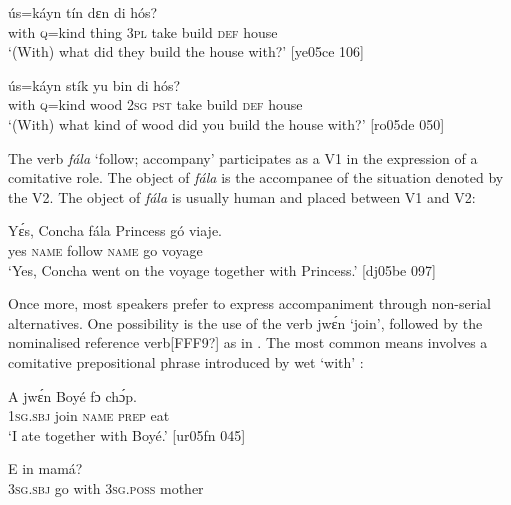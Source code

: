 \ea%
    \label{ex:key:1571}
    \gll {}    ús=káyn  tín    dɛn       di  hós?\\
with    \textsc{q}=kind  thing  \textsc{3pl}  take  build  \textsc{def}  house\\

\glt ‘(With) what did they build the house with?’ [ye05ce 106]
\z


\ea%
    \label{ex:key:1572}
    \gll {}    ús=káyn  stík    yu  bin         di  hós?\\
with    \textsc{q}=kind  wood  \textsc{2sg}  \textsc{pst}  take    build  \textsc{def}  house\\

\glt ‘(With) what kind of wood did you build the house with?’ [ro05de 050]
\z

The verb \textit{fála} ‘follow; accompany’ participates as a V1 in the expression of a comitative role. The object of \textit{fála} is the accompanee of the situation denoted by the V2. The object of \textit{fála} is usually human and placed between V1 and V2:


\ea%
    \label{ex:key:1573}
    \gll Yɛ́s,    Concha  fála    Princess    gó  viaje.\\
yes    \textsc{name}  follow  \textsc{name}    go  voyage\\

\glt ‘Yes, Concha went on the voyage together with Princess.’ [dj05be 097]
\z

Once more, most speakers prefer to express accompaniment through non-serial alternatives. One possibility is the use of the verb jwɛ́n ‘join’, followed by the nominalised reference verb[FFF9?] as in . The most common means involves a comitative prepositional phrase introduced by wet ‘with’ :


\ea%
    \label{ex:key:1574}
    \gll A    jwɛ́n  Boyé  fɔ  chɔ́p.\\
\textsc{1sg.sbj}  join    \textsc{name}  \textsc{prep}  eat\\

\glt ‘I ate together with Boyé.’ [ur05fn 045]
\z


\ea%
    \label{ex:key:1575}
    \gll E          in    mamá?\\
\textsc{3sg.sbj}  go  with    \textsc{3sg.poss}  mother\\

